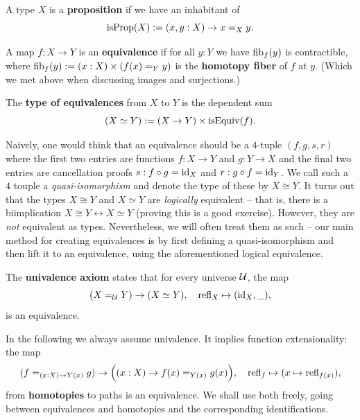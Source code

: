 \documentclass[10pt,oneside,leqno,openright]{memoir}
\begin{document}
\begin{definition}
    A type $X$ is a \textbf{proposition} if we have an inhabitant of
    \[ \operatorname{isProp}(X) := (x, y : X) \to x =_X y.\]
\end{definition}
    
\begin{definition}
  A map $f : X \to Y$ is an \textbf{equivalence} if for all $y : Y$ we have $\operatorname{fib}_f(y)$ is contractible, where $\operatorname{fib}_f(y) := (x:X)\times(f(x)=_Yy)$ is the \textbf{homotopy fiber} of $f$ at $y$. (Which we met above when discussing images and surjections.)

  The \textbf{type of equivalences} from $X$ to $Y$ is the dependent sum
  \[ (X \simeq Y) := (X \to Y) \times \operatorname{isEquiv}(f).\]
\end{definition}
\begin{remark}\label{rmk:qinv}
  Naively, one would  think that an equivalence should be a $4$-tuple $(f,g,s,r)$ where the first two entries are functions $f : X \to Y$ and $g:Y \to X$ and the final two entries are cancellation proofs $s:f \circ g = \operatorname{id}_X$ and $r : g \circ f = \operatorname{id}_Y$. We call such a $4$ touple a \emph{quasi-isomorphism} and denote the type of these by $X \cong Y$.
  It turns out that the types $X \cong Y$ and $X \simeq Y$ are \emph{logically} equivalent -- that is, there is a biimplication $X \cong Y \leftrightarrow X \simeq Y$ (proving this is a good exercise).
  However, they are \emph{not} equivalent as types.
  Nevertheless, we will often treat them as such -- our main method for creating equivalences is by first defining a quasi-isomorphism and then lift it to an equivalence, using the aforementioned logical equivalence.
\end{remark}


\begin{definition}
  The \textbf{univalence axiom} states that for every universe $\mathcal{U}$, the map
  \[
    (X=_{\mathcal{U}} Y) \to (X \simeq Y),
    \quad
    \mathrm{refl}_X \mapsto (\operatorname{id}_X, \_),
  \]
  is an equivalence.
\end{definition}

\begin{remark}
  In the following we always assume univalence. It implies function extensionality: the map
  \[ (f =_{(x:X) \to Y(x)} g) \to \Bigl((x:X) \to f(x)=_{Y(x)}g(x)\Bigr),
    \quad
    \mathrm{refl}_f \mapsto (x \mapsto \mathrm{refl}_{f(x)}),
  \]
  from \textbf{homotopies} to paths is an equivalence. We shall use both
  freely, going between equivalences and homotopies and the corresponding
  identifications.
\end{remark}
\end{document}
